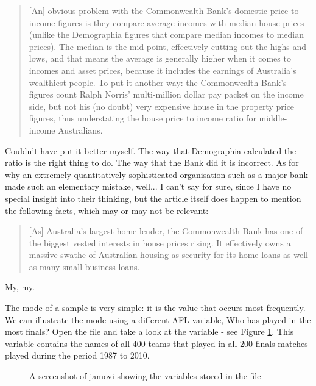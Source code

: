 \begin{quote}
[An] obvious problem with the Commonwealth Bank's domestic price to income figures is they compare average incomes with median house prices (unlike the Demographia figures that compare median incomes to median prices). The median is the mid-point, effectively cutting out the highs and lows, and that means the average is generally higher when it comes to incomes and asset prices, because it includes the earnings of Australia's wealthiest people. To put it another way: the Commonwealth Bank's figures count Ralph Norris' multi-million dollar pay packet on the income side, but not his (no doubt) very expensive house in the property price figures, thus understating the house price to income ratio for middle-income Australians.
\end{quote}
Couldn't have put it better myself. The way that Demographia calculated the ratio is the right thing to do. The way that the Bank did it is incorrect. As for why an extremely quantitatively sophisticated organisation such as a major bank made such an elementary mistake, well... I can't say for sure, since I have no special insight into their thinking, but the article itself does happen to mention the following facts, which may or may not be relevant:
\begin{quote}
[As] Australia's largest home lender, the Commonwealth Bank has one of the biggest vested interests in house prices rising. It effectively owns a massive swathe of Australian housing as security for its home loans as well as many small business loans.
\end{quote}
My, my. 


The mode of a sample is very simple: it is the value that occurs most frequently. We can illustrate the mode using a different AFL variable, Who has played in the most finals? Open the  file and take a look at the  variable - see Figure \ref{fig:aflsmall_finalists}. This variable contains the names of all 400 teams that played in all 200 finals matches played during the period 1987 to 2010. 
\vspace{1cm}
\begin{figure}[ht]
\begin{center}
\caption{A screenshot of jamovi showing the variables stored in the  file}
\label{fig:aflsmall_finalists}
\HR
\end{center}
\end{figure}

